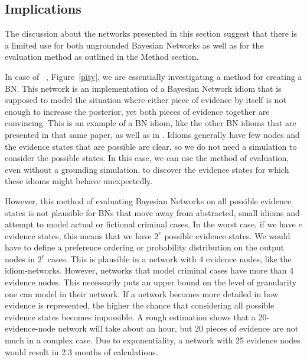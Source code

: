 \documentclass[12pt]{article}
\begin{document}
\subsection{Implications}

The discussion about the networks presented in this section suggest that there is a limited use for both ungrounded Bayesian Networks as well as for the evaluation method as outlined in the Method section.

In case of ~\citep{deZoete2019}, Figure~\ref{pity}, we are essentially investigating a method for creating a BN. This network is an implementation of a Bayesian Network idiom that is supposed to model the situation where either piece of evidence by itself is not enough to increase the posterior, yet both pieces of evidence together are convincing. This is an example of a BN idiom, like the other BN idioms that are presented in that same paper, as well as in \citet{Fenton2019}. Idioms generally have few nodes and the evidence states that are possible are clear, so we do not need a simulation to consider the possible states. In this case, we can use the method of evaluation, even without a grounding simulation, to discover the evidence states for which these idioms might behave unexpectedly.

However, this method of evaluating Bayesian Networks on all possible evidence states is not plausible for BNs that move away from abstracted, small idioms and attempt to model actual or fictional criminal cases. In the worst case, if we have $e$ evidence states, this means that we have $2^e$ possible evidence states. We would have to define a preference ordering or probability distribution on the output nodes in $2^e$ cases. This is plausible in a network with 4 evidence nodes, like the idiom-networks. However, networks that model criminal cases have more than 4 evidence nodes. This necessarily puts an upper bound on the level of granularity one can model in their network. If a network becomes more detailed in how evidence is represented, the higher the chance that considering all possible evidence states becomes impossible. A rough estimation shows that a 20-evidence-node network will take about an hour, but 20 pieces of evidence are not much in a complex case. Due to exponentiality, a network with 25 evidence nodes would result in 2.3 months of calculations.
\end{document}
